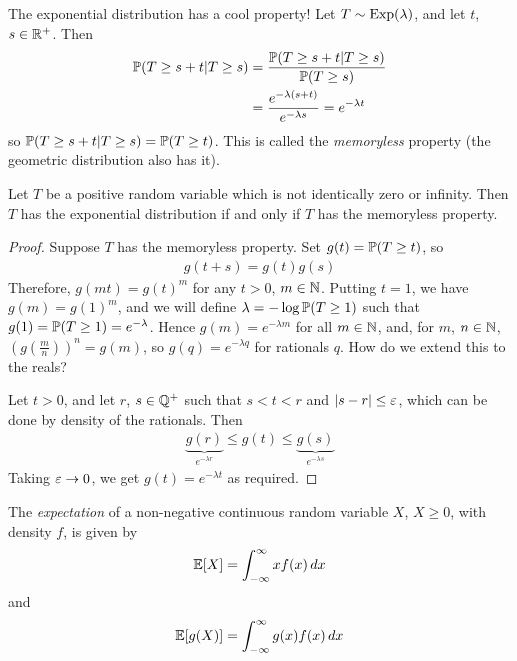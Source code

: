 \documentclass{../../template/note}
\begin{document}
\begin{enumerate}[label=\protect\circled{\arabic*}]
        The exponential distribution has a cool property! Let \(T \sim \operatorname{Exp}(\lambda)\), and let \(t\), \(s \in \mathbb R^+\). Then
        \begin{align*}
            \mathbb P(T \geq s + t | T \geq s) &= \frac{\mathbb P(T \geq s + t | T \geq s)}{\mathbb P(T \geq s)} \\
            &= \frac{e^{-\lambda(s+t)}}{e^{-\lambda s}} = e^{-\lambda t}
        \end{align*}
        so \(\mathbb P(T \geq s + t | T \geq s) = \mathbb P(T \geq t)\). This is called the \emph{memoryless} property (the geometric distribution also has it).
    \end{enumerate}

    \begin{proposition}
        Let \(T\) be a positive random variable which is not identically zero or infinity. Then \(T\) has the exponential distribution if and only if \(T\) has the memoryless property.
    \end{proposition}
    
    \begin{proof}
        Suppose \(T\) has the memoryless property. Set \(g(t) = \mathbb P(T \geq t)\), so
        \begin{align*}
            g(t+s) = g(t)g(s)
        \end{align*}
        Therefore, \(g(mt) = g(t)^m\) for any \(t > 0\), \(m \in \mathbb N\). Putting \(t=1\), we have \(g(m) = g(1)^m\), and we will define \(\lambda = -\log \mathbb P(T \geq 1)\) such that \(g(1) = \mathbb P(T \geq 1) = e^{-\lambda}\). Hence \(g(m) = e^{-\lambda m}\) for all \(m \in \mathbb N\), and, for \(m\), \(n \in \mathbb N\), \(\left(g\left(\frac m n \right)\right)^n = g(m)\), so \(g(q) = e^{-\lambda q}\) for rationals \(q\). How do we extend this to the reals?
        
        Let \(t > 0\), and let \(r\), \(s \in \mathbb Q^+\) such that \(s < t < r\) and \(|s-r| \leq \varepsilon\), which can be done by density of the rationals. Then
        \begin{align*}
            \underbrace{g(r)}_{e^{-\lambda r}} \leq g(t) \leq \underbrace{g(s)}_{e^{-\lambda s}}
        \end{align*}
        Taking \(\varepsilon \to 0\), we get \(g(t) = e^{-\lambda t}\) as required.
    \end{proof}


    \begin{definition}
        The \emph{expectation} of a non-negative continuous random variable \(X\), \(X \geq 0\), with density \(f\), is given by
        \begin{align*}
            \mathbb E[X] = \int_{-\infty}^\infty xf(x) \,d{x}
        \end{align*}
        and
        \begin{align*}
            \mathbb E[g(X)] = \int_{-\infty}^\infty g(x)f(x) \,d{x}
        \end{align*}
    \end{definition}
    
\end{document}
